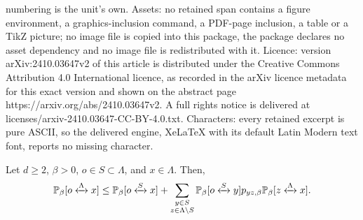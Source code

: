 \documentclass[10pt,a4paper]{amsart}
\newcommand{\connect}{\xleftrightarrow}
\begin{document}
numbering is the unit's own. Assets: no retained span contains a figure environment, a graphics-inclusion command, a PDF-page inclusion, a table or a TikZ picture; no image file is copied into this package, the package declares no asset dependency and no image file is redistributed with it. Licence: version arXiv:2410.03647v2 of this article is distributed under the Creative Commons Attribution 4.0 International licence, as recorded in the arXiv licence metadata for this exact version and shown on the abstract page https://arxiv.org/abs/2410.03647v2. A full rights notice is delivered at licenses/arxiv-2410.03647-CC-BY-4.0.txt. Characters: every retained excerpt is pure ASCII, so the delivered engine, XeLaTeX with its default Latin Modern text font, reports no missing character.
\begin{Lem}\label{Lem: SL upper bound} Let $d\geq 2$, $\beta>0$, $o\in S\subset \Lambda$, and $x\in \Lambda$. Then,
\begin{equation}\label{eq:SLperco}
	\mathbb P_{\beta}[o\connect{\Lambda\:}x]\le \mathbb P_{\beta}[o\connect{S\:}x]+ \sum_{\substack{y\in S\\ z\in \Lambda\setminus S}}\mathbb P_{\beta}[o\connect{S\:}y]p_{yz,\beta}\mathbb P_{\beta}[z\connect{\Lambda\:}x].
\end{equation}
\end{Lem}
\end{document}
